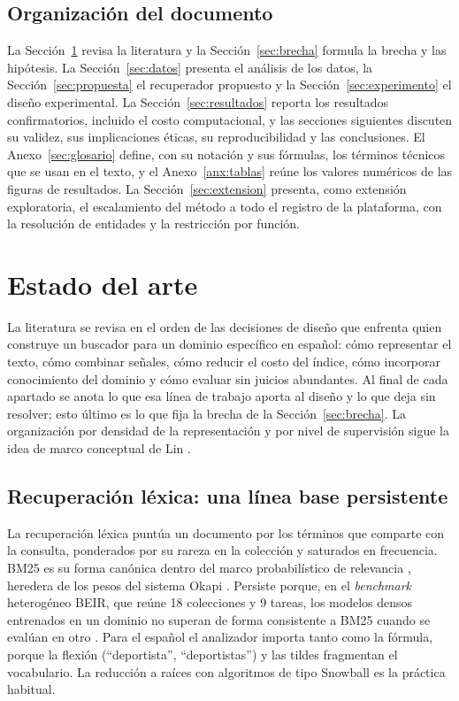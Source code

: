 \documentclass[11pt,letterpaper]{article}
\numberwithin{equation}{section}
\begin{document}
\subsection{Organización del documento}
La Sección~\ref{sec:estado-arte} revisa la literatura y la Sección~\ref{sec:brecha} formula la brecha y las hipótesis. La Sección~\ref{sec:datos} presenta el análisis de los datos, la Sección~\ref{sec:propuesta} el recuperador propuesto y la Sección~\ref{sec:experimento} el diseño experimental. La Sección~\ref{sec:resultados} reporta los resultados confirmatorios, incluido el costo computacional, y las secciones siguientes discuten su validez, sus implicaciones éticas, su reproducibilidad y las conclusiones. El Anexo~\ref{sec:glosario} define, con su notación y sus fórmulas, los términos técnicos que se usan en el texto, y el Anexo~\ref{anx:tablas} reúne los valores numéricos de las figuras de resultados. La Sección~\ref{sec:extension} presenta, como extensión exploratoria, el escalamiento del método a todo el registro de la plataforma, con la resolución de entidades y la restricción por función.

\section{Estado del arte}
\label{sec:estado-arte}

La literatura se revisa en el orden de las decisiones de diseño que enfrenta quien construye un buscador para un dominio específico en español: cómo representar el texto, cómo combinar señales, cómo reducir el costo del índice, cómo incorporar conocimiento del dominio y cómo evaluar sin juicios abundantes. Al final de cada apartado se anota lo que esa línea de trabajo aporta al diseño y lo que deja sin resolver; esto último es lo que fija la brecha de la Sección~\ref{sec:brecha}. La organización por densidad de la representación y por nivel de supervisión sigue la idea de marco conceptual de Lin \cite{lin2021representational}.

\subsection{Recuperación léxica: una línea base persistente}
\label{sec:ea-lexica}
La recuperación léxica puntúa un documento por los términos que comparte con la consulta, ponderados por su rareza en la colección y saturados en frecuencia. BM25 es su forma canónica dentro del marco probabilístico de relevancia \cite{robertson2009bm25}, heredera de los pesos del sistema Okapi \cite{robertson1995okapi}. Persiste porque, en el \textit{benchmark} heterogéneo BEIR, que reúne 18 colecciones y 9 tareas, los modelos densos entrenados en un dominio no superan de forma consistente a BM25 cuando se evalúan en otro \cite{thakur2021beir}. Para el español el analizador importa tanto como la fórmula, porque la flexión (``deportista'', ``deportistas'') y las tildes fragmentan el vocabulario. La reducción a raíces con algoritmos de tipo Snowball \cite{porter2001snowball} es la práctica habitual.
\end{document}
